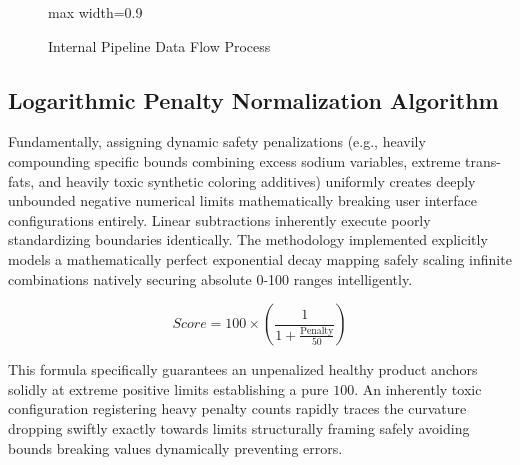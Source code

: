 \documentclass[12pt,a4paper]{report}
\begin{document}
\begin{figure}[htbp]
    \centering
    \begin{adjustbox}{max width=0.9\textwidth}
    \end{adjustbox}
    \caption{Internal Pipeline Data Flow Process}
\end{figure}

\subsection{Logarithmic Penalty Normalization Algorithm}
Fundamentally, assigning dynamic safety penalizations (e.g., heavily compounding specific bounds combining excess sodium variables, extreme trans-fats, and heavily toxic synthetic coloring additives) uniformly creates deeply unbounded negative numerical limits mathematically breaking user interface configurations entirely. Linear subtractions inherently execute poorly standardizing boundaries identically. The methodology implemented explicitly models a mathematically perfect exponential decay mapping safely scaling infinite combinations natively securing absolute 0-100 ranges intelligently.

\begin{equation}
    Score = 100 \times \left( \frac{1}{1 + \frac{\text{Penalty}}{50}} \right)
\end{equation}

This formula specifically guarantees an unpenalized healthy product anchors solidly at extreme positive limits establishing a pure $100$. An inherently toxic configuration registering heavy penalty counts rapidly traces the curvature dropping swiftly exactly towards limits structurally framing safely avoiding bounds breaking values dynamically preventing errors. 
\end{document}
